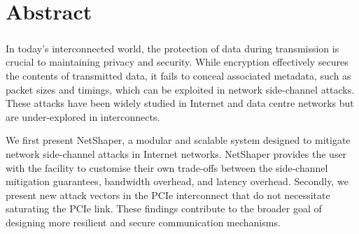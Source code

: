 
\chapter{Abstract}

\paragraph{} 

In today's interconnected world, the protection of data during transmission is crucial to maintaining privacy and security. 
While encryption effectively secures the contents of transmitted data, it fails to conceal associated metadata, such as packet sizes and timings, which can be exploited in network side-channel attacks. 
These attacks have been widely studied in Internet and data centre networks but are under-explored in interconnects.

We first present NetShaper, a modular and scalable system designed to mitigate network side-channel attacks in Internet networks.
NetShaper provides the user with the facility to customise their own trade-offs between the side-channel mitigation guarantees, bandwidth overhead, and latency overhead.
Secondly, we present new attack vectors in the PCIe interconnect that do not necessitate saturating the PCIe link.
These findings contribute to the broader goal of designing more resilient and secure communication mechanisms.

